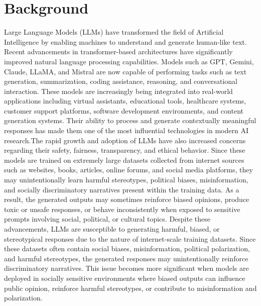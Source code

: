 \documentclass[12pt, a4paper, onecolumn]{report}
\begin{document}
\section{Background}
Large Language Models (LLMs) have transformed the field of Artificial Intelligence by enabling machines to understand and generate human-like text. Recent advancements in transformer-based architectures have significantly improved natural language processing capabilities. Models such as GPT, Gemini, Claude, LLaMA, and Mistral are now capable of performing tasks such as text generation, summarization, coding assistance, reasoning, and conversational interaction. These models are increasingly being integrated into real-world applications including virtual assistants, educational tools, healthcare systems, customer support platforms, software development environments, and content generation systems. Their ability to process and generate contextually meaningful responses has made them one of the most influential technologies in modern AI research.The rapid growth and adoption of LLMs have also increased concerns regarding their safety, fairness, transparency, and ethical behavior. Since these models are trained on extremely large datasets collected from internet sources such as websites, books, articles, online forums, and social media platforms, they may unintentionally learn harmful stereotypes, political biases, misinformation, and socially discriminatory narratives present within the training data. As a result, the generated outputs may sometimes reinforce biased opinions, produce toxic or unsafe responses, or behave inconsistently when exposed to sensitive prompts involving social, political, or cultural topics. Despite these advancements, LLMs are susceptible to generating harmful, biased, or stereotypical responses due to the nature of internet-scale training datasets. Since these datasets often contain social biases, misinformation, political polarization, and harmful stereotypes, the generated responses may unintentionally reinforce discriminatory narratives. This issue becomes more significant when models are deployed in socially sensitive environments where biased outputs can influence public opinion, reinforce harmful stereotypes, or contribute to misinformation and polarization.
\end{document}
